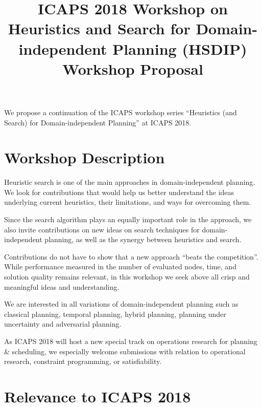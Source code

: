 \documentclass[10pt]{article}
\begin{document}
\title{ICAPS 2018 Workshop on \\ Heuristics and Search for Domain-independent
Planning (HSDIP)\\ \vspace*{0.7cm} Workshop Proposal
}
\date{}

\author{}

\maketitle


We propose a continuation of the ICAPS workshop series ``Heuristics
(and Search) for Domain-independent Planning'' at ICAPS 2018.

\section*{Workshop Description}
Heuristic search is one of the main approaches in domain-independent
planning.  We look for contributions that would help us better
understand the ideas underlying current heuristics, their limitations,
and ways for overcoming them.

Since the search algorithm plays an equally important role in the
approach, we also invite contributions on new ideas on search
techniques for domain-independent planning, as well as the synergy
between heuristics and search.

Contributions do not have to show that a new approach ``beats the competition''.
While performance measured in the number of evaluated nodes, time, and solution
quality remains relevant, in this workshop we seek above all crisp and
meaningful ideas and understanding.

We are interested in all variations of domain-independent planning
such as classical planning, temporal planning, hybrid planning, planning under
uncertainty and adversarial planning.

As ICAPS 2018 will host a new special track on operations research for planning
\& scheduling, we especially welcome submissions with relation to operational
research, constraint programming, or satisfiability.


\section*{Relevance to ICAPS 2018}
\end{document}
